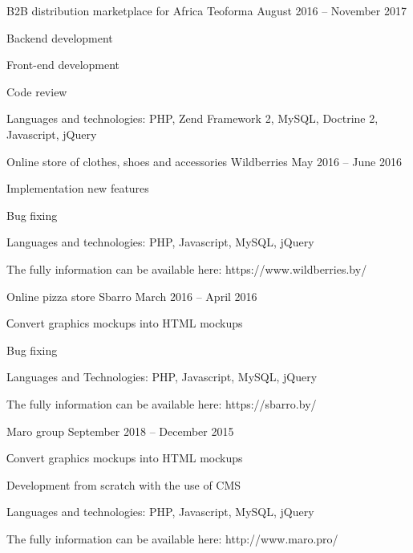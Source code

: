 \begin{cventries}
  \cventry
    {B2B distribution marketplace for Africa}
    {Teoforma}
    {}
    {August 2016 – November 2017}
    {
      \begin{cvitems}
        \item {Backend development}
        \item {Front-end development}
        \item {Code review}
        \item {Languages and technologies: PHP, Zend Framework 2, MySQL, Doctrine 2, Javascript, jQuery}
      \end{cvitems}
    }

  \cventry
    {Online store of clothes, shoes and accessories}
    {Wildberries}
    {}
    {May 2016 – June 2016}
    {
      \begin{cvitems}
        \item {Implementation new features}
        \item {Bug fixing}
        \item {Languages and technologies: PHP, Javascript, MySQL, jQuery}
        \item {The fully information can be available here: https://www.wildberries.by/}
      \end{cvitems}
    }

  \cventry
    {Online pizza store}
    {Sbarro}
    {}
    {March 2016 – April 2016}
    {
      \begin{cvitems}
        \item {Сonvert graphics mockups into HTML mockups}
        \item {Bug fixing}
        \item {Languages and Technologies: PHP, Javascript, MySQL, jQuery}
        \item {The fully information can be available here: https://sbarro.by/}
      \end{cvitems}
    }

  \cventry
    {}
    {Maro group}
    {}
    {September 2018 – December 2015}
    {
      \begin{cvitems}
        \vspace*{-5mm}
    		\item {Сonvert graphics mockups into HTML mockups}
    		\item {Development from scratch with the use of CMS}
        \item {Languages and technologies: PHP, Javascript, MySQL, jQuery}
        \item {The fully information can be available here: http://www.maro.pro/}
      \end{cvitems}
    }
	
\end{cventries}